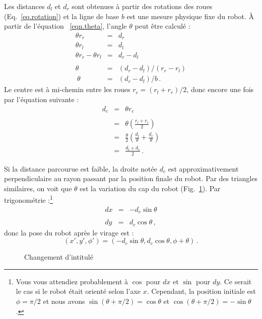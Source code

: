 {Les distances $d_l$ et $d_r$ sont obtenues à partir des rotations des roues (Eq.~\ref{eq.rotation}) et la ligne de base $b$ est une mesure physique fixe du robot. À partir de l'équation ~\ref{eqn.theta}, l'angle $\theta$ peut être calculé :
\begin{eqnarray*}
\theta r_r &=& d_r\\
\theta r_l &=& d_l\\
\theta r_r - \theta r_l &=& d_r - d_l\\\\
\theta &=& (d_r - d_l) / (r_r - r_l)\\\
\theta &=& (d_r - d_l) / b\,.
\end{eqnarray*}
Le centre est à mi-chemin entre les roues $r_c =(r_l+r_r)/2$,
donc encore une fois par l'équation suivante :
\begin{eqnarray*}
d_c&=&\theta r_c\\\\\
&=&\theta \left(\frac{r_l+r_r}{2}\right)\\
&=&\frac{\theta}{2} \left(\frac{d_l}{\theta} + \frac{d_r}{\theta}\right)\\\
&=&\frac{d_l+d_r}{2}\,.
\end{eqnarray*}

Si la distance parcourue est faible, la droite notée $d_c$ est approximativement
perpendiculaire au rayon passant par la position finale du robot. Par des triangles similaires, on voit que $\theta$ est la variation du cap du robot (Fig.~\ref{fig.heading}). Par trigonométrie :\footnote{Vous vous attendiez probablement à $\cos$ pour $dx$ et $\sin$ pour $dy$. Ce serait le cas si le robot était orienté selon l'axe $x$. Cependant, la position initiale est $\phi=\pi/2$ et nous avons $\sin(\theta+\pi/2)=\cos\theta$ et $\cos(\theta+\pi/2)=-\sin\theta$.}
\begin{eqnarray*}
\textit{dx} &=& - d_c \sin \theta\\\\
\textit{dy} &=& d_c \cos \theta\,,
\end{eqnarray*}
donc la pose du robot après le virage est :
\[
(x',y',\phi') = ( - d_c \sin \theta, d_c \cos \theta, \phi+\theta)\,.
\]

\begin{figure}
\begin{center}
\end{center}
\caption{Changement d'intitulé}\label{fig.heading}
\end{figure}

}
